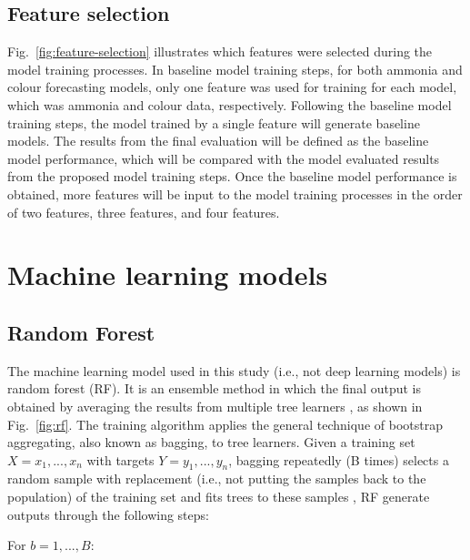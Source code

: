 \subsection{Feature selection}
Fig.~\ref{fig:feature-selection} illustrates which features were selected during the model training processes. In baseline model training steps, for both ammonia and colour forecasting models, only one feature was used for training for each model, which was ammonia and colour data, respectively. Following the baseline model training steps, the model trained by a single feature will generate baseline models. The results from the final evaluation will be defined as the baseline model performance, which will be compared with the model evaluated results from the proposed model training steps. Once the baseline model performance is obtained, more features will be input to the model training processes in the order of two features, three features, and four features.

\section{Machine learning models}
\subsection{Random Forest}
The machine learning model used in this study (i.e., not deep learning models) is random forest (RF). It is an ensemble method in which the final output is obtained by averaging the results from multiple tree learners \citep{wangMachineLearningFramework2021}, as shown in Fig.~\ref{fig:rf}. The training algorithm applies the general technique of bootstrap aggregating, also known as bagging, to tree learners. Given a training set $X = x_1, ..., x_n$ with targets $Y = y_1, ..., y_n$, bagging repeatedly (B times) selects a random sample with replacement (i.e., not putting the samples back to the population) of the training set and fits trees to these samples \citep{wikipediaRandomForest2022}, RF generate outputs through the following steps:

For $b=1, ..., B:$

